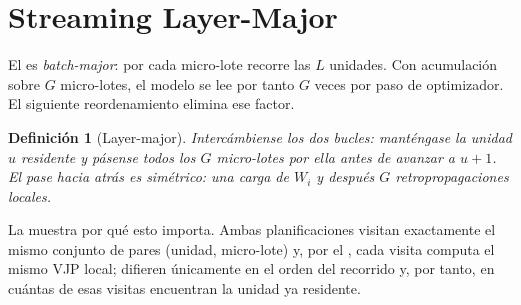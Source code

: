 \documentclass[journal]{IEEEtran}
\newtheorem{definition}[theorem]{Definición}
\begin{document}
\section{Streaming Layer-Major}
\label{sec:lm}

El  es \emph{batch-major}: por cada micro-lote recorre las $L$ unidades. Con
acumulación sobre $G$ micro-lotes, el modelo se lee por tanto $G$ veces por paso de optimizador. El
siguiente reordenamiento elimina ese factor.

\begin{definition}[Layer-major]
\label{def:lm}
Intercámbiense los dos bucles: manténgase la unidad $u$ residente y pásense todos los $G$
micro-lotes por ella antes de avanzar a $u+1$. El pase hacia atrás es simétrico: una carga de
$W_i$ y después $G$ retropropagaciones locales.
\end{definition}

La  muestra por qué esto importa. Ambas planificaciones visitan exactamente el
mismo conjunto de pares (unidad, micro-lote) y, por el , cada visita computa el
mismo VJP local; difieren únicamente en el orden del recorrido y, por tanto, en cuántas de esas
visitas encuentran la unidad ya residente.
\end{document}
